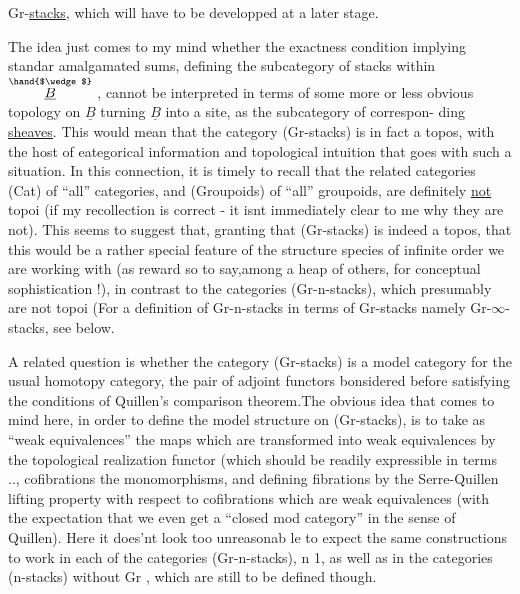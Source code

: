 Gr-\uline{stacks}, which will have to  be developped at a later stage.

The idea just comes to my mind whether the exactness condition
implying standar amalgamated sums, defining the subcategory of stacks
within $\overset{\hand{$\wedge$}}{\underline{B}}$ , cannot be interpreted in terms of some more or less obvious
topology on $\underline{B}$ turning $\underline{B}$ into a site, as the subcategory of correspon-%
ding \uline{sheaves}. This would mean that the category (Gr-stacks) is in fact
a topos, with the host of eategorical information and topological
intuition that goes with such a situation. In this connection, it is
timely to recall that the related categories (Cat) of ``all'' categories,
and (Groupoids) of ``all'' groupoids, are definitely \uline{not} topoi (if my
recollection is correct - it isnt immediately clear to me why they
are not). This seems to suggest that, granting that (Gr-stacks) is
indeed a topos, that this would be a rather special feature of the
structure species of infinite order we are working with (as  reward so
to say,among a heap of others, for conceptual sophistication !), in
contrast to the categories (Gr-n-stacks), which presumably are not topoi
(For a definition of Gr-n-stacks in terms of Gr-stacks namely
Gr-$\infty$-stacks, see below.\hand{)}

A related question is whether the category (Gr-stacks) is a model
category for the usual homotopy category, the pair of adjoint functors
bonsidered before satisfying  the conditions of Quillen's comparison
theorem.The obvious idea that comes to mind here, in order to define
the model structure on (Gr-stacks), is to take as ``weak equivalences''
the maps which are transformed into weak equivalences by the topological
realization functor (which should be readily expressible in  terms  ..\hand{)},
 cofibrations the monomorphisms, and defining fibrations by the
Serre-Quillen lifting property with respect to cofibrations which are
weak equivalences (with the expectation that we even get a ``closed mod
category'' in the sense of Quillen). Here it does'nt look too unreasonab
\hand{-}le to expect the same constructions to work in each of the categories
(Gr-n-stacks), n \over{$>$}{$\geqslant$}1, as well as in the categories (n-stacks) without
Gr , which are still to be defined though.


